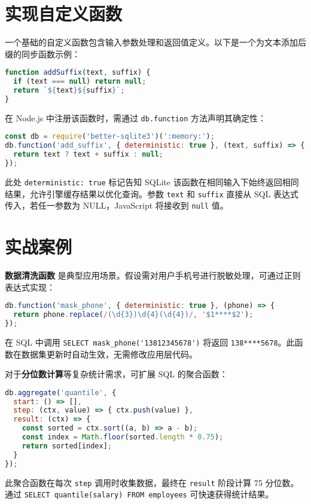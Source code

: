 \chapter{实现自定义函数}
一个基础的自定义函数包含输入参数处理和返回值定义。以下是一个为文本添加后缀的同步函数示例：\par
\begin{lstlisting}[language=javascript]
function addSuffix(text, suffix) {
  if (text === null) return null;
  return `${text}${suffix}`;
}
\end{lstlisting}
在 Node.js 中注册该函数时，需通过 \verb!db.function! 方法声明其确定性：\par
\begin{lstlisting}[language=javascript]
const db = require('better-sqlite3')(':memory:');
db.function('add_suffix', { deterministic: true }, (text, suffix) => {
  return text ? text + suffix : null;
});
\end{lstlisting}
此处 \verb!deterministic: true! 标记告知 SQLite 该函数在相同输入下始终返回相同结果，允许引擎缓存结果以优化查询。参数 \verb!text! 和 \verb!suffix! 直接从 SQL 表达式传入，若任一参数为 NULL，JavaScript 将接收到 \verb!null! 值。\par
\chapter{实战案例}
\textbf{数据清洗函数} 是典型应用场景。假设需对用户手机号进行脱敏处理，可通过正则表达式实现：\par
\begin{lstlisting}[language=javascript]
db.function('mask_phone', { deterministic: true }, (phone) => {
  return phone.replace(/(\d{3})\d{4}(\d{4})/, '$1****$2');
});
\end{lstlisting}
在 SQL 中调用 \verb!SELECT mask_phone('13812345678')! 将返回 \verb!138****5678!。此函数在数据集更新时自动生效，无需修改应用层代码。\par
对于\textbf{分位数计算}等复杂统计需求，可扩展 SQL 的聚合函数：\par
\begin{lstlisting}[language=javascript]
db.aggregate('quantile', {
  start: () => [],
  step: (ctx, value) => { ctx.push(value) },
  result: (ctx) => {
    const sorted = ctx.sort((a, b) => a - b);
    const index = Math.floor(sorted.length * 0.75);
    return sorted[index];
  }
});
\end{lstlisting}
此聚合函数在每次 \verb!step! 调用时收集数据，最终在 \verb!result! 阶段计算 75 分位数。通过 \verb!SELECT quantile(salary) FROM employees! 可快速获得统计结果。\par
